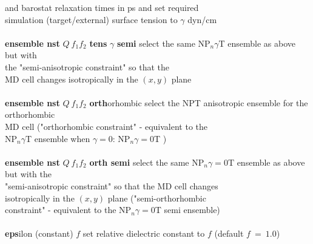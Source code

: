 \begin{tabbing}
\>                                              \> and barostat relaxation times in ps and set required \\
\>                                              \> simulation (target/external) surface tension to $\gamma$ dyn/cm \\
\>                                              \> \\
\> {\bf ensemble nst} $Q~f_{1} f_{2}$ {\bf tens} $\gamma$ {\bf semi} \> \phantom{xxx} select the same NP$_{n}\gamma$T ensemble as above but with \\
\>                                                                   \> \phantom{xxx} the "semi-anisotropic constraint" so that the\\
\>                                                                   \> \phantom{xxx} MD cell changes isotropically in the $(x,y)$ plane \\
\>                                              \> \\
\> {\bf ensemble nst} $Q~f_{1} f_{2}$ {\bf orth}orhombic             \> \phantom{xxx} select the NPT anisotropic ensemble for the orthorhombic\\
\>                                                                   \> \phantom{xxx} MD cell ("orthorhombic constraint" - equivalent to the \\
\>                                                                   \> \phantom{xxx} NP$_{n}\gamma$T ensemble when $\gamma=0$: NP$_{n}\gamma=0$T ) \\
\>                                              \> \\
\> {\bf ensemble nst} $Q~f_{1} f_{2}$ {\bf orth semi}                \> \phantom{xxx} select the same NP$_{n}\gamma=0$T ensemble as above but with the \\
\>                                                                   \> \phantom{xxx} "semi-anisotropic constraint" so that the MD cell changes \\
\>                                                                   \> \phantom{xxx} isotropically in the $(x,y)$ plane ("semi-orthorhombic \\
\>                                                                   \> \phantom{xxx} constraint" - equivalent to the NP$_{n}\gamma=0$T semi ensemble) \\
\>                                              \> \\
\> {\bf eps}ilon (constant) $f$                 \> set relative dielectric constant to $f$ (default $f~=~1.0$) \\

\end{tabbing}
